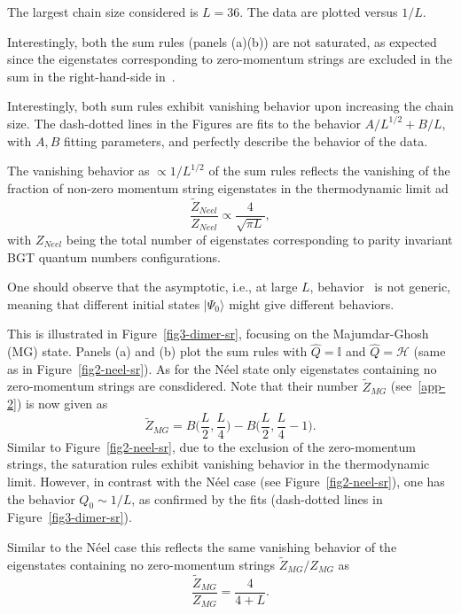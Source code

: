 \documentclass[11pt]{iopart}
\begin{document}
The largest chain size considered is $L=36$. The data are plotted versus $1/L$. 

Interestingly, both the sum rules (panels (a)(b)) are not saturated, as expected 
since the eigenstates corresponding to zero-momentum strings are excluded in the 
sum in the right-hand-side in~. 

Interestingly, both sum rules exhibit vanishing behavior upon increasing the 
chain size. The dash-dotted lines in the Figures are fits to the behavior 
$A/L^{1/2}+B/L$, with $A,B$ fitting parameters, and perfectly describe the 
behavior of the data. 

The vanishing behavior as $\propto 1/L^{1/2}$ of the sum rules reflects the vanishing 
of the fraction of non-zero momentum string eigenstates in the thermodynamic limit ad 
%
\begin{equation}
\label{beh}
\frac{\widetilde Z_{Neel}}{Z_{Neel}}\propto\frac{4}{\sqrt{\pi L}}, 
\end{equation}
% 
with $Z_{Neel}$ being the total number of eigenstates corresponding to parity 
invariant BGT quantum numbers configurations. 

One should observe that the asymptotic, i.e., at large $L$, behavior~ 
is not generic, meaning that different initial states $|\Psi_0\rangle$ might 
give different behaviors. 

This is illustrated in Figure~\ref{fig3-dimer-sr}, focusing on the Majumdar-Ghosh 
(MG) state. Panels (a) and (b) plot the sum rules with $\hat Q=\mathbb{I}$ and 
$\hat Q={\mathcal H}$ (same as in Figure~\ref{fig2-neel-sr}). As for the N\'eel 
state only eigenstates containing no zero-momentum strings are consdidered. 
Note that their number $\widetilde Z_{MG}$ (see~\ref{app-2}) is now given as 
%
\begin{equation}
\widetilde Z_{MG}=B\Big(\frac{L}{2},\frac{L}{4}\Big)-B\Big(\frac{L}{2},
\frac{L}{4}-1\Big). 
\end{equation}
%
Similar to Figure~\ref{fig2-neel-sr}, due to the exclusion of the zero-momentum 
strings, the saturation rules exhibit vanishing behavior in the thermodynamic 
limit. However, in contrast with the N\'eel case (see Figure~\ref{fig2-neel-sr}), 
one has the behavior $Q_0\sim 1/L$, as confirmed by the fits (dash-dotted lines 
in Figure~\ref{fig3-dimer-sr}). 

Similar to the N\'eel case this reflects the same vanishing behavior of the 
eigenstates containing no zero-momentum strings $\widetilde Z_{MG}/Z_{MG}$ as 
%
\begin{equation}
\frac{\widetilde Z_{MG}}{Z_{MG}}=\frac{4}{4+L}. 
\end{equation}
%
\end{document}
